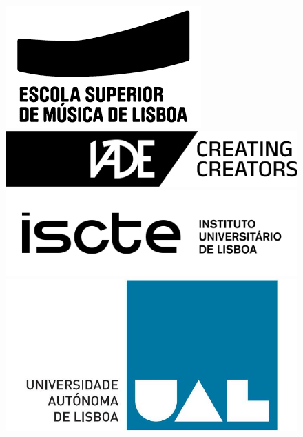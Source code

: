 \begin{figure}[ht]
\begin{minipage}[b]{0.06\linewidth}
        \end{minipage}
        \hfill
        \begin{minipage}[b]{0.06\linewidth}
            \includegraphics[width=\linewidth]{images/esmae.png}
        \end{minipage}
        \hfill
        \begin{minipage}[b]{0.06\linewidth}
            \includegraphics[width=\linewidth]{images/IADE.jpeg}
        \end{minipage}
        \hfill
        \begin{minipage}[b]{0.06\linewidth}
            \includegraphics[width=\linewidth]{images/iscte.png}
        \end{minipage}
        \hfill
        \begin{minipage}[b]{0.06\linewidth}
            \includegraphics[width=\linewidth]{images/ual.jpg}

\end{minipage}
\end{figure}

